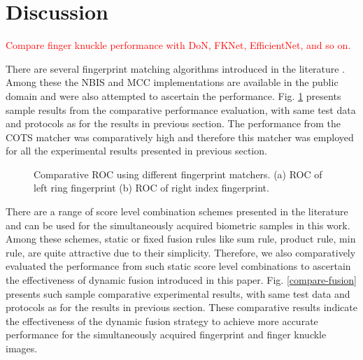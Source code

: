 \section{Discussion\label{discussion}}

\textcolor{red}{Compare finger knuckle performance with DoN, FKNet, EfficientNet, and so on.}


There are several fingerprint matching algorithms introduced in the literature \cite{maltoni2009handbook}. Among these the NBIS and MCC implementations are available in the public domain and were also attempted to ascertain the performance. Fig. \ref{compare-fingerprint} presents sample results from the comparative performance evaluation, with same test data and protocols as for the results in previous section. The performance from the COTS matcher was comparatively high and therefore this matcher was employed for all the experimental results presented in previous section. 
\begin{figure}[h]
    \centering
    \caption{Comparative ROC using different fingerprint matchers. (a) ROC of left ring fingerprint (b) ROC of right index fingerprint.}
    \label{compare-fingerprint}
\end{figure}

There are a range of score level combination schemes presented in the literature and can be used for the simultaneously acquired biometric samples in this work. Among these schemes, static or fixed fusion rules like sum rule, product rule, min rule, are quite attractive due to their simplicity. Therefore, we also comparatively evaluated the performance from such static score level combinations to ascertain the effectiveness of dynamic fusion introduced in this paper. Fig. \ref{compare-fusion} presents such sample comparative experimental results, with same test data and  protocols as for the results in previous section. These comparative results indicate the effectiveness of the dynamic fusion strategy to achieve more accurate performance for the simultaneously acquired fingerprint and finger knuckle images.

